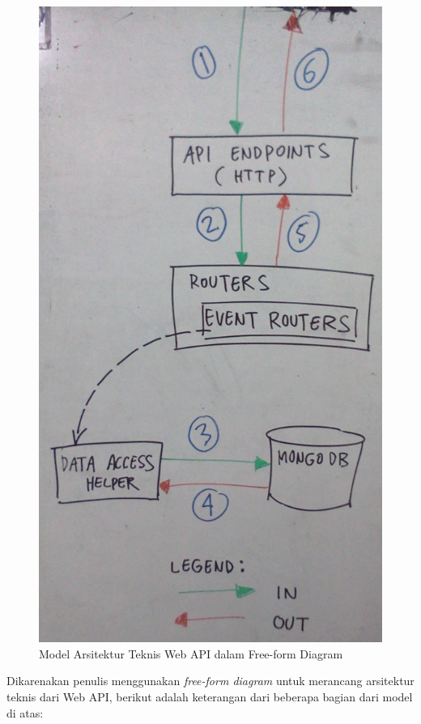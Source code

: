 \documentclass[a4paper, 12pt, oneside]{report}
\begin{document}
\begin{figure}[htp]
\centering
\includegraphics[scale=0.20]{images/arsitektur-teknis-web-api.jpg}
\caption{Model Arsitektur Teknis Web API dalam Free-form Diagram}
\label{arsitektur-teknis-web-api}
\end{figure}

\onehalfspacing Dikarenakan penulis menggunakan \textit{free-form diagram} untuk merancang arsitektur teknis dari Web API, berikut adalah keterangan dari beberapa bagian dari model di atas:
\end{document}
